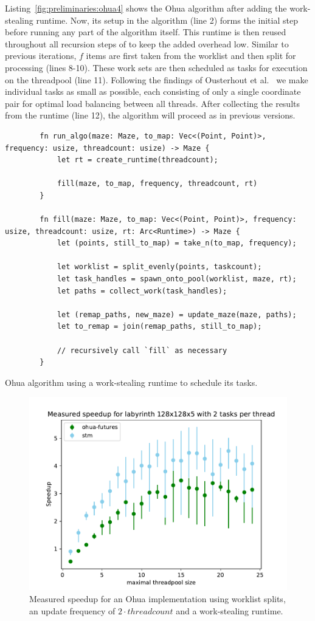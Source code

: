 Listing~\ref{fig:preliminaries:ohua4} shows the Ohua algorithm after adding the work-stealing runtime.
Now, its setup in the algorithm  (line 2) forms the initial step before running any part of the algorithm itself.
This runtime is then reused throughout all recursion steps of  to keep the added overhead low.
Similar to previous iterations, $f$ items are first taken from the worklist and then split for processing (lines 8-10).
These work sets are then scheduled as tasks for execution on the threadpool (line 11).
Following the findings of Ousterhout et al.~\cite{ousterhout2013case} we make individual tasks as small as possible, each consisting of only a single coordinate pair for optimal load balancing between all threads.
After collecting the results from the runtime (line 12), the algorithm will proceed as in previous versions.

\begin{listing}[t]
    \begin{verbatim}
        fn run_algo(maze: Maze, to_map: Vec<(Point, Point)>, frequency: usize, threadcount: usize) -> Maze {
            let rt = create_runtime(threadcount);

            fill(maze, to_map, frequency, threadcount, rt)
        }

        fn fill(maze: Maze, to_map: Vec<(Point, Point)>, frequency: usize, threadcount: usize, rt: Arc<Runtime>) -> Maze {
            let (points, still_to_map) = take_n(to_map, frequency);

            let worklist = split_evenly(points, taskcount);
            let task_handles = spawn_onto_pool(worklist, maze, rt);
            let paths = collect_work(task_handles);
        
            let (remap_paths, new_maze) = update_maze(maze, paths);
            let to_remap = join(remap_paths, still_to_map);
        
            // recursively call `fill` as necessary
        }
    \end{verbatim}
    \caption{Ohua algorithm using a work-stealing runtime to schedule its tasks.}%
    \label{fig:preliminaries:ohua4}
\end{listing}

\begin{figure}[b]
    \centering
    \includegraphics[width=.5\textwidth,keepaspectratio]{gfx/preliminaries-labyrinth/current-128x128x5}
    \caption{Measured speedup for an Ohua implementation using worklist splits, an update frequency of $2 \cdot threadcount$ and a work-stealing runtime.}%
    \label{fig:preliminaries:future-results}
\end{figure}

